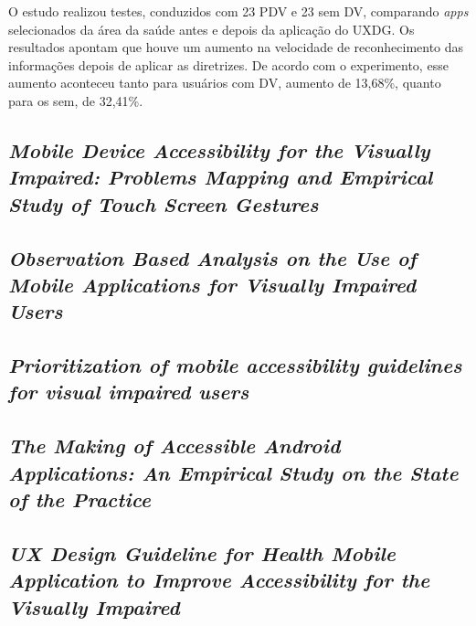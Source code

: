 O estudo realizou testes, conduzidos com 23 PDV e 23 sem DV, comparando \emph{apps} selecionados da área da saúde antes e depois da aplicação do UXDG\@.
Os resultados apontam que houve um aumento na velocidade de reconhecimento das informações depois de aplicar as diretrizes.
De acordo com o experimento, esse aumento aconteceu tanto para usuários com DV, aumento de 13,68\%, quanto para os sem, de 32,41\%.

\subsection{\emph{Mobile Device Accessibility for the Visually Impaired: Problems Mapping and Empirical Study of Touch Screen Gestures}}

\cite{Damaceno2016}

\subsection{\emph{Observation Based Analysis on the Use of Mobile Applications for Visually Impaired Users}}

\cite{Siebra2016}

\subsection{\emph{Prioritization of mobile accessibility guidelines for visual impaired users}}

\cite{Quispe2020}

\subsection{\emph{The Making of Accessible Android Applications: An Empirical Study on the State of the Practice}}

\cite{DiGregorio2020857}

\subsection{\emph{UX Design Guideline for Health Mobile Application to Improve Accessibility for the Visually Impaired}}

\cite{Kim2016}